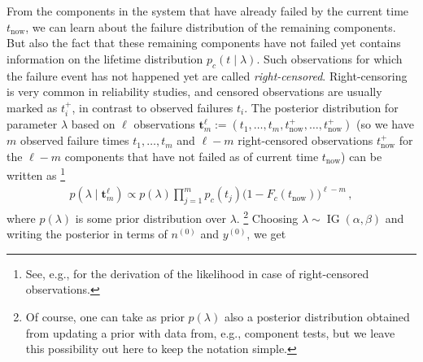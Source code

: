 \documentclass[12pt,a4paper,twocolumn,fleqn]{narms}
\renewcommand{\vec}[1]{{\bm#1}}
\newcommand{\uz}{^{(0)}} %
\newcommand{\ig}{\operatorname{IG}}   %
\def\yz{y\uz}
\def\nz{n\uz}
\begin{document}
From the components in the system that have already failed by the current time $t_\text{now}$,
we can learn about the failure distribution of the remaining components.
But also the fact that these remaining components have not failed yet
contains information on the lifetime distribution $p_c(t\mid \lambda)$.
Such observations for which the failure event has not happened yet are called \emph{right-censored}.
Right-censoring is very common in reliability studies,
and censored observations are usually marked as $t_i^+$, in contrast to observed failures $t_i$.
The posterior distribution for parameter $\lambda$
based on $\ell$ observations $\vec{t}_m^\ell := (t_1,\ldots,t_m,t^+_\text{now},\ldots,t^+_\text{now})$
(so we have $m$ observed failure times $t_1,\ldots,t_m$
and $\ell-m$ right-censored observations $t^+_\text{now}$
for the $\ell-m$ components that have not failed as of current time $t_\text{now}$)
can be written as%
\footnote{See, e.g.,  for the derivation of the likelihood in case of right-censored observations.}
\begin{align}
p(\lambda \mid \vec{t}_m^\ell) \propto p(\lambda) \prod_{j=1}^m p_c(t_j) \big(1-F_c(t_\text{now})\big)^{\ell-m}\,,
\end{align}
where $p(\lambda)$ is some prior distribution over $\lambda$.%
\footnote{Of course, one can take as prior $p(\lambda)$ also a posterior distribution
obtained from updating a prior with data from, e.g., component tests,
but we leave this possibility out here to keep the notation simple.}
%
Choosing $\lambda \sim \ig(\alpha,\beta)$ and writing the posterior in terms of $\nz$ and $\yz$, we get
\end{document}
